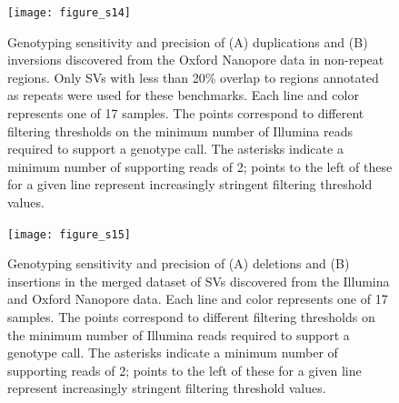 \documentclass[12pt]{article}
\newenvironment{cfigure}
	{\begin{figure} \centering}
	{\end{figure}}
\newenvironment{lsfigure}
	{\begin{landscape} \begin{figure} \centering}
	{\end{figure} \end{landscape}}
\begin{document}
\begin{cfigure}
	\texttt{[image: figure\_s14]}

	\caption[Sensitivity and precision of Oxford Nanopore duplication and inversion genotyping in non-repeat regions]{
		Genotyping sensitivity and precision of (A) duplications and (B) inversions discovered from the Oxford Nanopore data in non-repeat regions.
		Only SVs with less than 20\% overlap to regions annotated as repeats were used for these benchmarks. 
		Each line and color represents one of 17 samples. 
		The points correspond to different filtering thresholds on the minimum number of Illumina reads required to support a genotype call.
		The asterisks indicate a minimum number of supporting reads of 2; points to the left of these for a given line represent increasingly stringent filtering threshold values.
	}

	\label{fig_s14}

\end{cfigure}

\clearpage%

\begin{lsfigure}
	\texttt{[image: figure\_s15]}

	\caption[Sensitivity and precision of joint Illumina/Oxford Nanopore deletion and insertion genotyping]{
		Genotyping sensitivity and precision of (A) deletions and (B) insertions in the merged dataset of SVs discovered from the Illumina and Oxford Nanopore data.
			Each line and color represents one of 17 samples. 
			The points correspond to different filtering thresholds on the minimum number of Illumina reads required to support a genotype call.
			The asterisks indicate a minimum number of supporting reads of 2; points to the left of these for a given line represent increasingly stringent filtering threshold values.
	}

	\label{fig_s15}
\end{lsfigure}

\clearpage%
\end{document}
